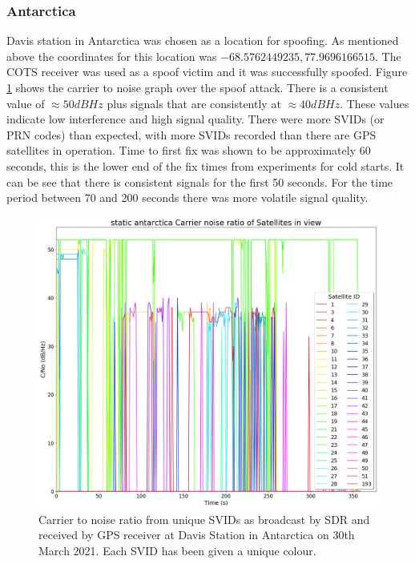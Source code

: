 \subsubsection{Antarctica}
Davis station in Antarctica was chosen as a location for spoofing. As mentioned above the coordinates for this location was $-68.5762449235, 77.9696166515$. The COTS
receiver was used as a spoof victim and it was successfully spoofed. Figure \ref{fig:antarcticaStaticCNo} shows the carrier to noise graph over the spoof attack. There is
a consistent value of $\approx 50 dBHz$ plus signals that are consistently at $\approx 40 dBHz$. These values indicate low interference and high signal quality. There
were more SVIDs (or PRN codes) than expected, with more SVIDs recorded than there are GPS satellites in operation. 
Time to first fix was shown to be approximately 60 seconds, this is the lower end of the fix times from experiments for cold starts. 
It can be see that there is consistent signals for the first 50 seconds. For the time period between 70 and
200 seconds there was more volatile signal quality. 

\begin{figure}[H]
    \begin{centering}
        \includegraphics[width=14cm,keepaspectratio]{Figures/2021_3_30_static_antarctica Carrier noise ratio.png}
        \caption{Carrier to noise ratio from unique SVIDs as broadcast by SDR and received by GPS receiver at Davis Station in Antarctica on 30th March 2021. Each SVID has been given a unique colour.}
        \label{fig:antarcticaStaticCNo}
    \end{centering}
\end{figure}

